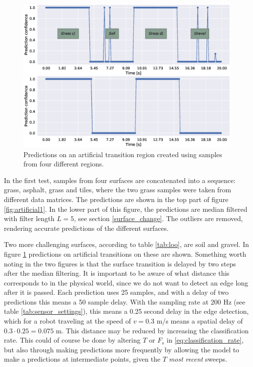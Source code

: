 \begin{figure}[t]
	\centering
	\includegraphics[scale=0.5]{figs_temp/varmats2}
	\caption{Predictions on an artificial transition region created using samples from four different regions.}
	\label{fig:artificial2}
\end{figure}

In the first test, samples from four surfaces are concatenated into a sequence: grass, asphalt, grass and tiles, where the two grass samples were taken from different data matrices. The predictions are shown in the top part of figure \ref{fig:artificial1}. In the lower part of this figure, the predictions are median filtered with filter length $L=5$, see section \ref{surface_change}. The outliers are removed, rendering accurate predictions of the different surfaces. 

Two more challenging surfaces, according to table \ref{tab:loo}, are soil and gravel. In figure \ref{fig:artificial2} predictions on artificial transitions on these are shown. Something worth noting in the two figures is that the surface transition is delayed by two steps after the median filtering. It is important to be aware of what distance this corresponds to in the physical world, since we do not want to detect an edge long after it is passed. Each prediction uses 25 samples, and with a delay of two predictions this means a 50 sample delay. With the sampling rate at 200 Hz (see table \ref{tab:sensor_settings}), this means a 0.25 second delay in the edge detection, which for a robot traveling at the speed of $v=0.3$ m/s means a spatial delay of $0.3\cdot0.25=0.075$ m. This distance may be reduced by increasing the classification rate. This could of course be done by altering $T$ or $F_s$ in \eqref{eq:classification_rate}, but also through making predictions more frequently by allowing the model to make a predictions at intermediate points, given the $T$ \emph{most recent} sweeps.

